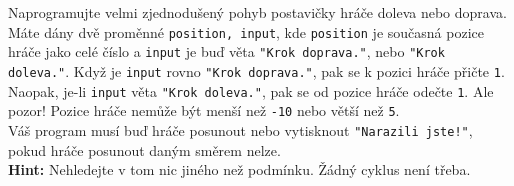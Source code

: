 \question[50]
Naprogramujte velmi zjednodušený pohyb postavičky hráče doleva nebo doprava.\\
Máte dány dvě proměnné \texttt{position, input}, kde \texttt{position} je
současná pozice hráče jako celé číslo a \texttt{input} je buď věta \texttt{"Krok
	doprava."}, nebo \texttt{"Krok doleva."}. Když je \texttt{input} rovno
\texttt{"Krok doprava."}, pak se k pozici hráče přičte \texttt{1}. Naopak, je-li
\texttt{input} věta \texttt{"Krok doleva."}, pak se od pozice hráče odečte
\texttt{1}. Ale pozor! Pozice hráče nemůže být menší než \texttt{-10} nebo větší
než \texttt{5}.\\
Váš program musí buď hráče posunout nebo vytisknout \texttt{"Narazili jste!"},
pokud hráče posunout daným směrem nelze.\\
\textbf{Hint:} Nehledejte v tom nic jiného než podmínku. Žádný cyklus není třeba.